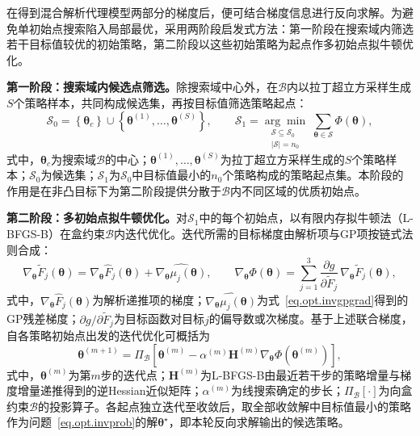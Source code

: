 在得到混合解析代理模型两部分的梯度后，便可结合梯度信息进行反向求解。为避免单初始点搜索陷入局部最优，采用两阶段启发式方法：第一阶段在搜索域内筛选若干目标值较优的初始策略，第二阶段以这些初始策略为起点作多初始点拟牛顿优化。

\textbf{第一阶段：搜索域内候选点筛选。}除搜索域中心外，在$\mathcal{B}$内以拉丁超立方采样生成$S$个策略样本，共同构成候选集，再按目标值筛选策略起点：
\begin{equation}
\mathcal{S}_{0}=\left\{\bm{\theta}_{c}\right\}\cup\left\{\bm{\theta}^{(1)},\dots,\bm{\theta}^{(S)}\right\},\qquad
\mathcal{S}_{1}=\underset{\substack{\mathcal{S}\subseteq\mathcal{S}_{0}\\ \left|\mathcal{S}\right|=n_{0}}}{\arg\min}\;\sum_{\bm{\theta}\in\mathcal{S}}\Phi\left(\bm{\theta}\right),
\label{eq.opt.invseed}
\end{equation}
式中，$\bm{\theta}_{c}$为搜索域$\mathcal{B}$的中心；$\bm{\theta}^{(1)},\dots,\bm{\theta}^{(S)}$为拉丁超立方采样生成的$S$个策略样本；$\mathcal{S}_{0}$为候选集；$\mathcal{S}_{1}$为$\mathcal{S}_{0}$中目标值最小的$n_{0}$个策略构成的策略起点集。本阶段的作用是在非凸目标下为第二阶段提供分散于$\mathcal{B}$内不同区域的优质初始点。

\textbf{第二阶段：多初始点拟牛顿优化。}对$\mathcal{S}_{1}$中的每个初始点，以有限内存拟牛顿法（L-BFGS-B）在盒约束$\mathcal{B}$内迭代优化。迭代所需的目标梯度由解析项与GP项按链式法则合成：
\begin{equation}
\nabla_{\bm{\theta}}\tilde{F}_{j}\left(\bm{\theta}\right)
=\nabla_{\bm{\theta}}\hat{F}_{j}\left(\bm{\theta}\right)
+\widehat{\nabla_{\bm{\theta}}\mu_{j}\left(\bm{\theta}\right)},\qquad
\nabla_{\bm{\theta}}\Phi\left(\bm{\theta}\right)
=\sum_{j=1}^{3}\frac{\partial g}{\partial\tilde{F}_{j}}\,
\nabla_{\bm{\theta}}\tilde{F}_{j}\left(\bm{\theta}\right),
\label{eq.opt.invgrad}
\end{equation}
式中，$\nabla_{\bm{\theta}}\hat{F}_{j}\left(\bm{\theta}\right)$为解析递推项的梯度；$\widehat{\nabla_{\bm{\theta}}\mu_{j}\left(\bm{\theta}\right)}$为式~\eqref{eq.opt.invgpgrad}得到的GP残差梯度；$\partial g/\partial\tilde{F}_{j}$为目标函数对目标$j$的偏导数或次梯度。基于上述联合梯度，自各策略初始点出发的迭代优化可概括为
\begin{equation}
\bm{\theta}^{(m+1)}=\Pi_{\mathcal{B}}\left[\bm{\theta}^{(m)}-\alpha^{(m)}\bm{H}^{(m)}\nabla_{\bm{\theta}}\Phi\left(\bm{\theta}^{(m)}\right)\right],
\label{eq.opt.invqn}
\end{equation}
式中，$\bm{\theta}^{(m)}$为第$m$步的迭代点；$\bm{H}^{(m)}$为L-BFGS-B由最近若干步的策略增量与梯度增量递推得到的逆Hessian近似矩阵；$\alpha^{(m)}$为线搜索确定的步长；$\Pi_{\mathcal{B}}\left[\cdot\right]$为向盒约束$\mathcal{B}$的投影算子。各起点独立迭代至收敛后，取全部收敛解中目标值最小的策略作为问题~\eqref{eq.opt.invprob}的解$\bm{\theta}^{\star}$，即本轮反向求解输出的候选策略。

